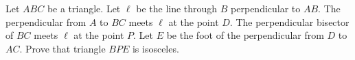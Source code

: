Let $ABC$ be a triangle. Let $\ell$ be the line through $B$ perpendicular to $AB$. The perpendicular from $A$ to $BC$ meets $\ell$ at the point $D$. The perpendicular bisector of $BC$ meets $\ell$ at the point $P$. Let $E$ be the foot of the perpendicular from $D$ to $AC$. Prove that triangle $BPE$ is isosceles.
